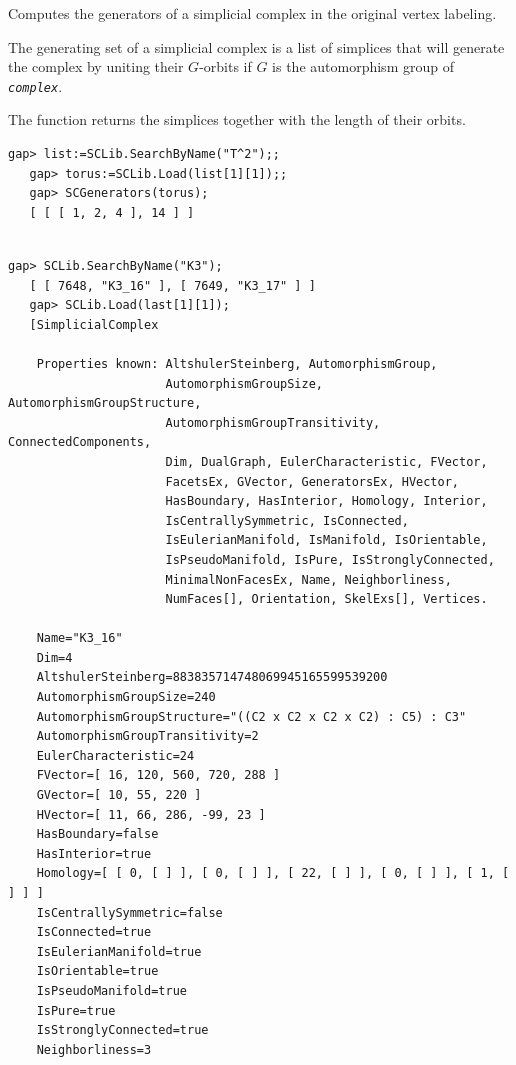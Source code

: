 \documentclass[a4paper,11pt]{report}
\begin{document}
{{{ Computes the generators of a simplicial complex in the original vertex
labeling.

 The generating set of a simplicial complex is a list of simplices that will
generate the complex by uniting their $G$-orbits if $G$ is the automorphism group of \mbox{\texttt{\mdseries\slshape complex}}.

 The function returns the simplices together with the length of their orbits. 
\begin{Verbatim}[commandchars=!@|,fontsize=\small,frame=single,label=Example]
   gap> list:=SCLib.SearchByName("T^2");;
   gap> torus:=SCLib.Load(list[1][1]);;
   gap> SCGenerators(torus); 
   [ [ [ 1, 2, 4 ], 14 ] ]
   
\end{Verbatim}
 
\begin{Verbatim}[commandchars=!@|,fontsize=\small,frame=single,label=Example]
   gap> SCLib.SearchByName("K3");
   [ [ 7648, "K3_16" ], [ 7649, "K3_17" ] ]
   gap> SCLib.Load(last[1][1]);
   [SimplicialComplex
   
    Properties known: AltshulerSteinberg, AutomorphismGroup, 
                      AutomorphismGroupSize, AutomorphismGroupStructure, 
                      AutomorphismGroupTransitivity, ConnectedComponents, 
                      Dim, DualGraph, EulerCharacteristic, FVector, 
                      FacetsEx, GVector, GeneratorsEx, HVector, 
                      HasBoundary, HasInterior, Homology, Interior, 
                      IsCentrallySymmetric, IsConnected, 
                      IsEulerianManifold, IsManifold, IsOrientable, 
                      IsPseudoManifold, IsPure, IsStronglyConnected, 
                      MinimalNonFacesEx, Name, Neighborliness, 
                      NumFaces[], Orientation, SkelExs[], Vertices.
   
    Name="K3_16"
    Dim=4
    AltshulerSteinberg=883835714748069945165599539200
    AutomorphismGroupSize=240
    AutomorphismGroupStructure="((C2 x C2 x C2 x C2) : C5) : C3"
    AutomorphismGroupTransitivity=2
    EulerCharacteristic=24
    FVector=[ 16, 120, 560, 720, 288 ]
    GVector=[ 10, 55, 220 ]
    HVector=[ 11, 66, 286, -99, 23 ]
    HasBoundary=false
    HasInterior=true
    Homology=[ [ 0, [ ] ], [ 0, [ ] ], [ 22, [ ] ], [ 0, [ ] ], [ 1, [ ] ] ]
    IsCentrallySymmetric=false
    IsConnected=true
    IsEulerianManifold=true
    IsOrientable=true
    IsPseudoManifold=true
    IsPure=true
    IsStronglyConnected=true
    Neighborliness=3
   

\end{Verbatim}}}}
\end{document}
